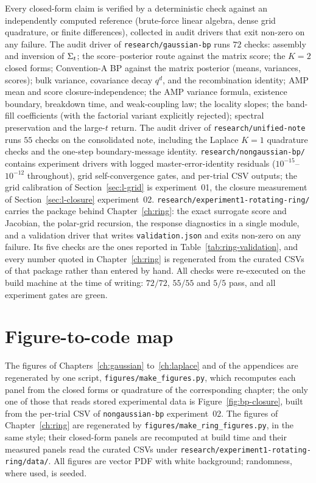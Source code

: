 Every closed-form claim is verified by a deterministic check against an
independently computed reference (brute-force linear algebra, dense grid
quadrature, or finite differences), collected in audit drivers that exit
non-zero on any failure. The audit driver of
\texttt{research/gaussian-bp} runs $72$ checks:
assembly and inversion of $\Sigma_t$; the score--posterior route against the
matrix score; the $K = 2$ closed forms; Convention-A BP against the
matrix posterior (means, variances, scores); bulk variance, covariance
decay $q^d$, and the recombination identity; AMP mean and score
closure-independence; the AMP variance formula, existence boundary,
breakdown time, and weak-coupling law; the locality slopes; the band-fill
coefficients (with the factorial variant explicitly rejected); spectral
preservation and the large-$t$ return.
The audit driver of \texttt{research/unified-note} runs $55$ checks on
the consolidated note, including the Laplace $K = 1$ quadrature checks
and the one-step boundary-message identity.
\texttt{research/nongaussian-bp/} contains experiment drivers with logged
master-error-identity residuals ($10^{-15}$--$10^{-12}$ throughout), grid
self-convergence gates, and per-trial CSV outputs; the grid calibration
of Section~\ref{sec:l-grid} is experiment~01, the closure measurement of
Section~\ref{sec:l-closure} experiment~02.
\texttt{research/experiment1-rotating-ring/} carries the package behind
Chapter~\ref{ch:ring}: the exact surrogate score and Jacobian, the polar-grid
recursion, the response diagnostics in a single module, and a validation driver
that writes \texttt{validation.json} and exits non-zero on any failure. Its five
checks are the ones reported in Table~\ref{tab:ring-validation}, and every
number quoted in Chapter~\ref{ch:ring} is regenerated from the curated CSVs of
that package rather than entered by hand. All checks were re-executed on
the build machine at the time of writing: $72/72$, $55/55$ and $5/5$ pass, and
all experiment gates are green.

\section{Figure-to-code map}

The figures of Chapters~\ref{ch:gaussian} to~\ref{ch:laplace} and of the
appendices are regenerated by one script, \texttt{figures/make\_figures.py},
which recomputes each panel from the closed forms or quadrature of the
corresponding chapter; the only one of those that reads stored experimental
data is Figure~\ref{fig:bp-closure}, built from the per-trial CSV of
\texttt{nongaussian-bp} experiment~02. The figures of Chapter~\ref{ch:ring} are
regenerated by \texttt{figures/make\_ring\_figures.py}, in the same style;
their closed-form panels are recomputed at build time and their measured panels
read the curated CSVs under \texttt{research/experiment1-rotating-ring/data/}.
All figures are vector PDF with white background; randomness, where used,
is seeded.

